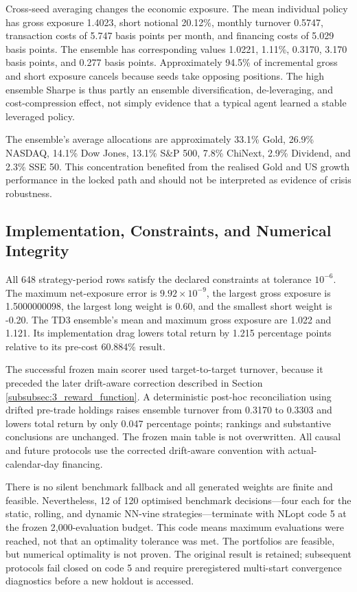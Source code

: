 Cross-seed averaging changes the economic exposure. The mean individual policy has gross exposure 1.4023, short notional 20.12\%, monthly turnover 0.5747, transaction costs of 5.747 basis points per month, and financing costs of 5.029 basis points. The ensemble has corresponding values 1.0221, 1.11\%, 0.3170, 3.170 basis points, and 0.277 basis points. Approximately 94.5\% of incremental gross and short exposure cancels because seeds take opposing positions. The high ensemble Sharpe is thus partly an ensemble diversification, de-leveraging, and cost-compression effect, not simply evidence that a typical agent learned a stable leveraged policy.

The ensemble's average allocations are approximately 33.1\% Gold, 26.9\% NASDAQ, 14.1\% Dow Jones, 13.1\% S\&P 500, 7.8\% ChiNext, 2.9\% Dividend, and 2.3\% SSE 50. This concentration benefited from the realised Gold and US growth performance in the locked path and should not be interpreted as evidence of crisis robustness.

\subsection{Implementation, Constraints, and Numerical Integrity}
\label{subsec:4_implementation}

All 648 strategy-period rows satisfy the declared constraints at tolerance $10^{-6}$. The maximum net-exposure error is $9.92\times10^{-9}$, the largest gross exposure is 1.5000000098, the largest long weight is 0.60, and the smallest short weight is -0.20. The TD3 ensemble's mean and maximum gross exposure are 1.022 and 1.121. Its implementation drag lowers total return by 1.215 percentage points relative to its pre-cost 60.884\% result.

The successful frozen main scorer used target-to-target turnover, because it preceded the later drift-aware correction described in Section \ref{subsubsec:3_reward_function}. A deterministic post-hoc reconciliation using drifted pre-trade holdings raises ensemble turnover from 0.3170 to 0.3303 and lowers total return by only 0.047 percentage points; rankings and substantive conclusions are unchanged. The frozen main table is not overwritten. All causal and future protocols use the corrected drift-aware convention with actual-calendar-day financing.

There is no silent benchmark fallback and all generated weights are finite and feasible. Nevertheless, 12 of 120 optimised benchmark decisions---four each for the static, rolling, and dynamic NN-vine strategies---terminate with NLopt code 5 at the frozen 2,000-evaluation budget. This code means maximum evaluations were reached, not that an optimality tolerance was met. The portfolios are feasible, but numerical optimality is not proven. The original result is retained; subsequent protocols fail closed on code 5 and require preregistered multi-start convergence diagnostics before a new holdout is accessed.

